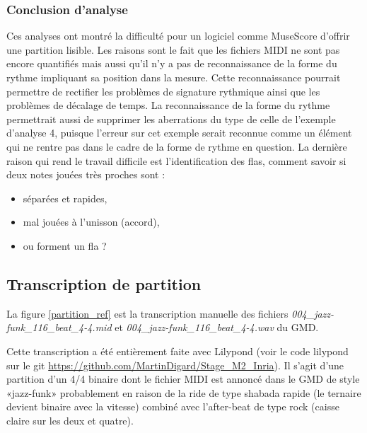 \subsubsection{Conclusion d’analyse}
Ces analyses ont montré la difficulté pour un logiciel comme MuseScore d’offrir
une partition lisible. Les raisons sont le fait que les fichiers MIDI ne sont
pas encore quantifiés mais aussi qu’il n’y a pas de reconnaissance de la forme 
du rythme impliquant sa position dans la mesure. Cette reconnaissance pourrait
permettre de rectifier les problèmes de signature rythmique ainsi que les
problèmes de décalage de temps. La reconnaissance de la forme du rythme
permettrait aussi de supprimer les aberrations du type de celle de l’exemple
d’analyse 4, puisque l’erreur sur cet exemple serait reconnue comme un élément
qui ne rentre pas dans le cadre de la forme de rythme en question. La dernière
raison qui rend le travail difficile est l’identification des flas, comment
savoir si deux notes jouées très proches sont :
\begin{itemize}
    \item séparées et rapides,
    \item mal jouées à l’unisson (accord),
    \item ou forment un fla ?
\end{itemize}


\subsection*{Transcription de partition}
\label{partition_entiere}
La figure \ref{partition_ref} est la transcription manuelle des fichiers
\textit{004\_jazz-funk\_116\_beat\_4-4.mid} et
\textit{004\_jazz-funk\_116\_beat\_4-4.wav} du GMD.

Cette transcription a été entièrement faite avec Lilypond (voir le code
lilypond sur le git \url{https://github.com/MartinDigard/Stage_M2_Inria}). Il
s’agit d’une partition d’un 4/4 binaire dont le fichier MIDI est annoncé dans
le GMD de style «jazz-funk» probablement en raison de la ride de type shabada
rapide (le ternaire devient binaire avec la vitesse) combiné avec l’after-beat
de type rock (caisse claire sur les deux et quatre).

